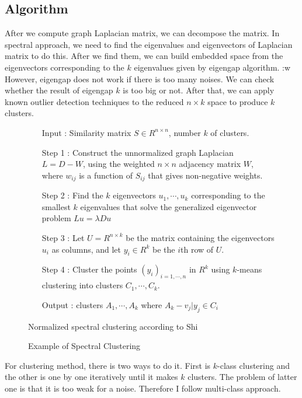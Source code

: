 \subsection{Algorithm}
After we compute graph Laplacian matrix, we can decompose the matrix. 
In spectral approach, we need to find the eigenvalues and eigenvectors of Laplacian matrix to do this. 
After we find them, we can build embedded space from the eigenvectors corresponding to the $k$ eigenvalues given by eigengap algorithm. :w
However, eigengap does not work if there is too many noises. 
We can check whether the result of eigengap $k$ is too big or not.
After that, we can apply known outlier detection techniques\cite{knorr00} to the reduced $n \times k$ space to produce $k$ clusters. 
\begin{figure}[ht]
\begin{mdframed}
\begin{enumerate}
\item[Input] : Similarity matrix $S \in R^{n \times n}$, number $k$ of clusters. \\
\item[Step 1] : Construct the unnormalized graph Laplacian $L = D - W$, using the weighted $n \times n$ adjacency matrix $W$, where $w_{ij}$ is a function of $S_{ij}$ that gives non-negative weights. \\
\item[Step 2] : Find the $k$ eigenvectors $u_1, \cdots, u_k$ corresponding to the smallest $k$ eigenvalues that solve the generalized eigenvector problem $L u = \lambda D u$ \\
\item[Step 3] : Let $U = R^{n \times k}$ be the matrix containing the eigenvectors $u_i$ as columns, and let $y_i \in R^k$ be the $i$th row of $U$.\\
\item[Step 4] : Cluster the points $(y_i)_{i=1,\cdots,n}$ in $R^k$ using $k$-means clustering into clusters $C_1,\cdots,C_k$.\\
\item[Output] : clusters $A_1, \cdots, A_k$ where $A_k - {v_j|y_j \in C_i}$
\end{enumerate}
\end{mdframed}
\caption{Normalized spectral clustering according to Shi}
\end{figure}

\begin{figure}[htb2]
\begin{center}
\end{center}
\caption{Example of Spectral Clustering}
\label{fig:refSingleRobot1}
\end{figure}

For clustering method, there is two ways to do it. 
First is $k$-class clustering\cite{jianbo03} and the other is one by one iteratively until it makes $k$ clusters. 
The problem of latter one is that it is too weak for a noise. 
Therefore I follow multi-class approach. 

